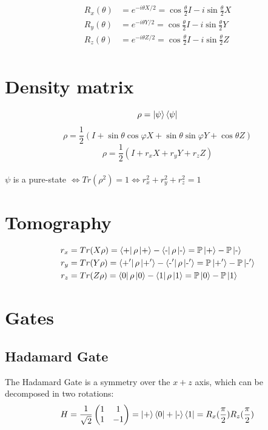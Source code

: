\documentclass[a4paper,10pt]{scrartcl}
\begin{document}
\begin{equation*}
\begin{split}
R_x(\theta) &= e^{-i\theta X /2} = \cos{\frac{\theta}{2}}I - i\sin{\frac{\theta}{2}}X \\
R_y(\theta) &= e^{-i\theta Y /2} = \cos{\frac{\theta}{2}}I - i\sin{\frac{\theta}{2}}Y \\
R_z(\theta) &= e^{-i\theta Z /2} = \cos{\frac{\theta}{2}}I - i\sin{\frac{\theta}{2}}Z \\
\end{split}
\end{equation*}

\section*{Density matrix}
\[\rho = \ket{\psi}\bra{\psi}\]
\[\rho = \frac{1}{2}(I + \sin \theta \cos \varphi X + \sin \theta \sin \varphi Y + \cos \theta Z)\]
\[\rho = \frac{1}{2}(I + r_x X +  r_y Y + r_z Z)\]
\\
$\psi$ is a pure-state $\Leftrightarrow Tr(\rho ^ 2) = 1 \Leftrightarrow r_x^2+ r_y^2 + r_z^2 = 1$

\section*{Tomography}

\begin{equation*}
\begin{split}
r_x &= Tr(X\rho) = \bra{\text{+}}{\rho} \ket{\text{+}} - \bra{\text{-}}{\rho} \ket{\text{-}} = \mathbb{P}\ket{\text{+}}-\mathbb{P}\ket{\text{-}}\\
r_y &= Tr(Y\rho) = \bra{\text{+}'}{\rho} \ket{\text{+}'} - \bra{\text{-}'}{\rho} \ket{\text{-}'} = \mathbb{P}\ket{\text{+}'}-\mathbb{P}\ket{\text{-}'}\\
r_z &= Tr(Z\rho) = \bra{0}{\rho} \ket{0} - \bra{1}{\rho} \ket{1} = \mathbb{P}\ket{0}-\mathbb{P}\ket{1}
\end{split}
\end{equation*}

\section*{Gates}
\subsection*{Hadamard Gate}
The Hadamard Gate is a symmetry over the $x+z$ axis, which can be decomposed in two rotations:
\[H = 
\frac{1}{\sqrt{2}}\begin{pmatrix}
1 & 1\\ 
1 & -1
\end{pmatrix}
= \ket{\text{+}}\bra{0} + \ket{\text{-}}\bra{1}
= R_x(\frac{\pi}{2})R_z(\frac{\pi}{2})
\]
\end{document}
